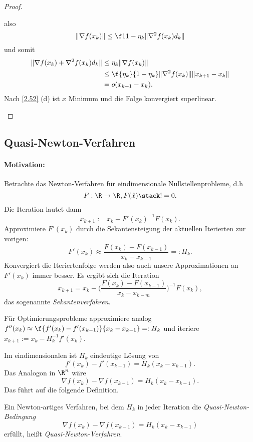 \begin{st}
\begin{proof}
\begin{enumerate}[(a)]
				also
				\[
					\|\nabla f(x_k) \|
					\le \f 1{1 - \eta_k} \|\nabla^2 f(x_k) d_k\|
				\]
				und somit
				\begin{align*}
					\|\nabla f(x_k) + \nabla^2 f(x_k) d_k \|
					&\le \eta_k \|\nabla f(x_k)\| \\
					&\le \f {\eta_k}{1-\eta_k} \|\nabla^2 f(x_k)\|\|x_{k+1} - x_k\| \\
					&= o(x_{k+1} - x_k).
				\end{align*}
				Nach \ref{2.52} (d) ist $\hat x$ Minimum und die Folge konvergiert superlinear.
		\end{enumerate}
	\end{proof}
\end{st}

\subsection{Quasi-Newton-Verfahren}

\paragraph{Motivation:}

Betrachte das Newton-Verfahren für eindimensionale Nullstellenprobleme, d.h
\[
	F: \R \to \R, F(\hat x) \stack != 0.
\]
Die Iteration lautet dann
\[
	x_{k+1} := x_k - F'(x_k)^{-1} F(x_k).
\]
Approximiere $F'(x_k)$ durch die Sekantensteigung der aktuellen Iterierten zur vorigen:
\[
	F'(x_k) \approx \dfrac {F(x_k) - F(x_{k-1})}{x_k - x_{k-1}} =: H_k.
\]
Konvergiert die Iteriertenfolge werden also auch unsere Approximationen an $F'(x_k)$ immer besser.
Es ergibt sich die Iteration
\[
	x_{k+1} = x_k - \bigg(\dfrac{F(x_k) - F(x_{k-1})}{x_k - x_{k-m}} \bigg)^{-1} F(x_k),
\]
das sogenannte \emph{Sekantenverfahren}.

Für Optimierungsprobleme approximiere analog $f''(x_k) \approx \f {f'(x_k) - f'(x_{k-1})}{x_k - x_{k-1}} =: H_k$ und iteriere $x_{k+1} := x_k - H_k^{-1} f'(x_k)$.

Im eindimensionalen ist $H_k$ eindeutige Lösung von
\[
	f'(x_k) - f'(x_{k-1})
	= H_k (x_k - x_{k-1}).
\]
Das Analogon in $\R^n$ wäre
\[
	\nabla f(x_k) - \nabla f(x_{k-1})
	= H_k (x_k -x_{k-1}).
\]
Das führt auf die folgende Definition.

\begin{df*}
	Ein Newton-artiges Verfahren, bei dem $H_k$ in jeder Iteration die \emph{Quasi-Newton-Bedingung}
	\begin{equation} \label{eq:qn}
		\nabla f(x_k) - \nabla f(x_{k-1})
		= H_k (x_k -x_{k-1})
		\tag{QN}
	\end{equation}
	erfüllt, heißt \emph{Quasi-Newton-Verfahren}.
\end{df*}

